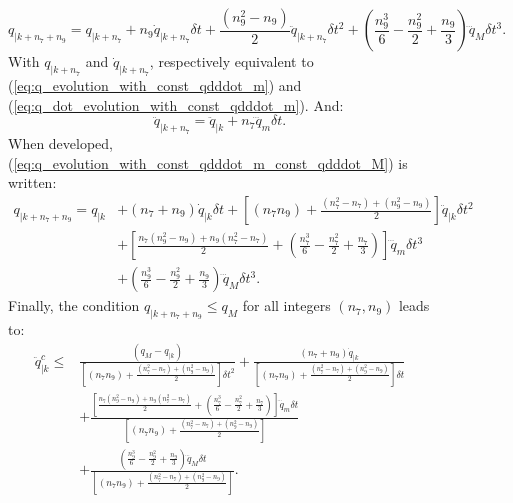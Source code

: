 \begin{figure}[!htbp]
\begin{equation}
q_{|k+n_7+n_9} = q_{|k+n_7} + n_9 \dot{q}_{|k+n_7} \delta t +  \frac{\left(n_9^2-n_9\right)}{2} \ddot{q}_{|k+n_7} \delta t^2 + \left(\frac{n_9^3}{6}-\frac{n_9^2}{2}+\frac{n_9}{3}\right) \dddot{q}_M \delta t^3.
\label{eq:q_evolution_with_const_qdddot_m_const_qdddot_M}
\end{equation}
With $q_{|k+n_{7}}$ and $\dot{q}_{|k+n_{7}}$, respectively equivalent to (\ref{eq:q_evolution_with_const_qdddot_m}) and (\ref{eq:q_dot_evolution_with_const_qdddot_m}). And: 
\begin{equation}
\ddot{q}_{|k+n_7} = \ddot{q}_{|k} + n_{7} \dddot{q}_m \delta t.
\label{eq:q_ddot_evo_in_n_7_iteration_q_dddot_m}
\end{equation}
When developed, (\ref{eq:q_evolution_with_const_qdddot_m_const_qdddot_M}) is written:
\begin{equation}
\begin{split}
q_{|k+n_7+n_9} = q_{|k} & + \left(n_7+n_9\right) \dot{q}_{|k} \delta t + \left[\left(n_7 n_9\right)+\frac{\left(n_{7}^{2}-n_7\right)+\left(n_{9}^{2}-n_9\right)}{2}\right] \ddot{q}_{|k} \delta t^2 \\
& + \left[\frac{n_{7}\left(n_{9}^{2}-n_9\right)+n_{9}\left(n_{7}^{2}-n_7\right)}{2}+\left(\frac{n_{7}^{3}}{6}-\frac{n_{7}^{2}}{2}+\frac{n_{7}}{3}\right)\right] \dddot{q}_m \delta t^3 \\
& + \left(\frac{n_{9}^{3}}{6}-\frac{n_{9}^{2}}{2}+\frac{n_{9}}{3}\right) \dddot{q}_M \delta t^3.
\end{split}
\label{eq:q_evolution_with_const_qdddot_m_const_qdddot_M_dev}
\end{equation}
Finally, the condition $q_{|k+n_7+n_9} \leq q_{M}$ for all integers $(n_7, n_9)$ leads to:
\begin{equation}
\begin{split}
\ddot{q}_{|k}^{c} \leq & \frac{\left(q_M-q_{|k}\right)}{\left[\left(n_7 n_9\right)+\frac{\left(n_{7}^{2}-n_7\right)+\left(n_{9}^{2}-n_9\right)}{2}\right] \delta t^2} + \frac{\left(n_7+n_9\right) \dot{q}_{|k}}{\left[\left(n_7 n_9\right)+\frac{\left(n_{7}^{2}-n_7\right)+\left(n_{9}^{2}-n_9\right)}{2}\right] \delta t} \\
& + \frac{\left[\frac{n_{7}\left(n_{9}^{2}-n_9\right)+n_{9}\left(n_{7}^{2}-n_7\right)}{2}+\left(\frac{n_{7}^{3}}{6}-\frac{n_{7}^{2}}{2}+\frac{n_{7}}{3}\right)\right] \dddot{q}_m \delta t}{\left[\left(n_7 n_9\right)+\frac{\left(n_{7}^{2}-n_7\right)+\left(n_{9}^{2}-n_9\right)}{2}\right]} \\
& + \frac{\left(\frac{n_{9}^{3}}{6}-\frac{n_{9}^{2}}{2}+\frac{n_{9}}{3}\right) \dddot{q}_M \delta t}{\left[\left(n_7 n_9\right)+\frac{\left(n_{7}^{2}-n_7\right)+\left(n_{9}^{2}-n_9\right)}{2}\right]}.

\end{split}
\end{equation}
\end{figure}
